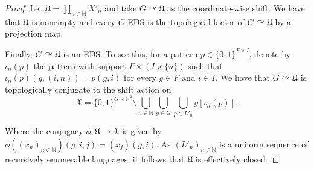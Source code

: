 \documentclass[10pt,a4paper]{amsart}
\newcommand{\NN}{\mathbb{N}}
\begin{document}
\begin{proof}
    Let $\mathfrak{U}=\prod_{n \in \NN}X'_n$ and take $G\curvearrowright \mathfrak{U}$ as the coordinate-wise shift. We have that $\mathfrak{U}$ is nonempty and every $G$-EDS is the topological factor of $G\curvearrowright \mathfrak{U}$ by a projection map.

    Finally, $G\curvearrowright \mathfrak{U}$ is an EDS. To see this, for a pattern $p \in \{0,1\}^{F\times I}$, denote by $\iota_n(p)$ the pattern with support $F\times (I\times \{n\})$ such that $\iota_n(p) (g,(i,n))= p(g,i)$ for every $g\in F$ and $i \in I$. We have that $G\curvearrowright \mathfrak{U}$ is topologically conjugate to the shift action on
\[  \mathfrak{X} = \{0,1\}^{G \times \NN^2}\setminus \bigcup_{n \in \NN}\bigcup_{g \in G}\bigcup_{p \in L'_n}g[\iota_n(p)]. \]

Where the conjugacy $\phi\colon \mathfrak{U}\to \mathfrak{X}$ is given by $\phi( (x_n)_{n \in \NN})(g,i,j) = (x_j)(g,i)$. As $(L'_n)_{n \in \NN}$ is a uniform sequence of recursively enumerable languages, it follows that $\mathfrak{U}$ is effectively closed.\end{proof}
\end{document}
